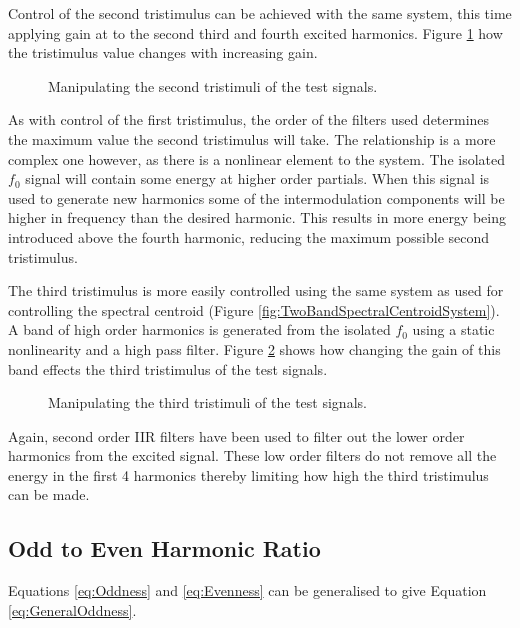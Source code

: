 		Control of the second tristimulus can be achieved with the same system, this time applying gain at to the
		second third and fourth excited harmonics. Figure \ref{fig:MoveTristimulus2} how the tristimulus value
		changes with increasing gain.

		\begin{figure}[h!]
			\centering
			\resizebox{0.6\textwidth}{!}{}
			\caption{Manipulating the second tristimuli of the test signals.}
			\label{fig:MoveTristimulus2}
		\end{figure}

		As with control of the first tristimulus, the order of the filters used determines the maximum value the
		second tristimulus will take. The relationship is a more complex one however, as there is a nonlinear
		element to the system. The isolated $f_{0}$ signal will contain some energy at higher order partials.  When
		this signal is used to generate new harmonics some of the intermodulation components will be higher in
		frequency than the desired harmonic. This results in more energy being introduced above the fourth
		harmonic, reducing the maximum possible second tristimulus.

		The third tristimulus is more easily controlled using the same system as used for controlling the spectral
		centroid (Figure \ref{fig:TwoBandSpectralCentroidSystem}). A band of high order harmonics is generated from
		the isolated $f_{0}$ using a static nonlinearity and a high pass filter.  Figure \ref{fig:MoveTristimulus3}
		shows how changing the gain of this band effects the third tristimulus of the test signals.

		\begin{figure}[h!]
			\centering
			\resizebox{0.6\textwidth}{!}{}
			\caption{Manipulating the third tristimuli of the test signals.}
			\label{fig:MoveTristimulus3}
		\end{figure}

		Again, second order IIR filters have been used to filter out the lower order harmonics from the excited
		signal.	These low order filters do not remove all the energy in the first 4 harmonics thereby limiting how
		high the third tristimulus can be made.

	\subsection{Odd to Even Harmonic Ratio}
	\label{sec:FeatureControl-Parameterisation-HarmonicParityRatio}
		Equations \ref{eq:Oddness} and \ref{eq:Evenness} can be generalised to give Equation
		\ref{eq:GeneralOddness}.

